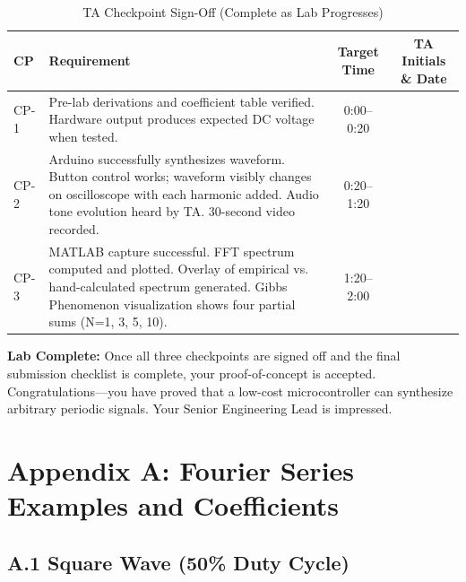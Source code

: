 \documentclass[11pt,letterpaper]{article}
\begin{document}
\begin{table}[H]
    \centering
    \caption{TA Checkpoint Sign-Off (Complete as Lab Progresses)}
    \label{tab:checkpoints}
    \begin{tabularx}{\linewidth}{l X c c}
    \toprule
    \textbf{CP} & \textbf{Requirement} & \textbf{Target Time} & \textbf{TA Initials \& Date}\\
    \midrule
    CP-1 & Pre-lab derivations and coefficient table verified. Hardware output produces expected DC voltage when tested. & 0:00--0:20 & \underline{\hspace{2.5cm}} \\[0.1in]
    CP-2 & Arduino successfully synthesizes waveform. Button control works; waveform visibly changes on oscilloscope with each harmonic added. Audio tone evolution heard by TA. 30-second video recorded. & 0:20--1:20 & \underline{\hspace{2.5cm}} \\[0.1in]
    CP-3 & MATLAB capture successful. FFT spectrum computed and plotted. Overlay of empirical vs. hand-calculated spectrum generated. Gibbs Phenomenon visualization shows four partial sums (N=1, 3, 5, 10). & 1:20--2:00 & \underline{\hspace{2.5cm}} \\[0.1in]
    \bottomrule
    \end{tabularx}
\end{table}

\noindent
\textbf{Lab Complete:} Once all three checkpoints are signed off and the final submission checklist is complete, your proof-of-concept is accepted. Congratulations—you have proved that a low-cost microcontroller can synthesize arbitrary periodic signals. Your Senior Engineering Lead is impressed.

\clearpage

\section*{Appendix A: Fourier Series Examples and Coefficients}

\subsection*{A.1 Square Wave (50\% Duty Cycle)}
\end{document}
